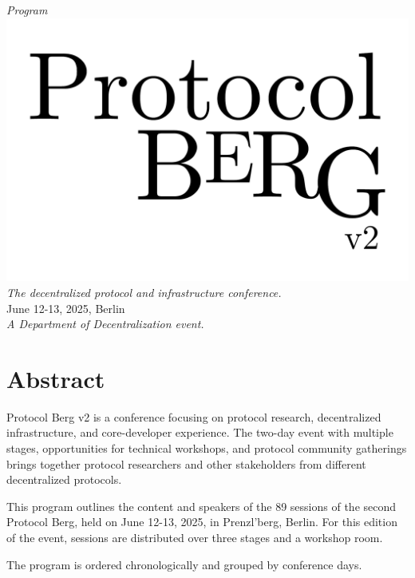 \begin{titlepage}
  \begin{center}
    \textit{\huge Program}\\[1em]
    \includegraphics[width=\textwidth]{protocol.pdf}\\[1em]
    \textit{The decentralized protocol and infrastructure conference.}\\
    {June 12-13, 2025, Berlin}\\[1em]
    \vspace{\fill}
    \textit{\small A Department of Decentralization event.}
  \end{center}
\end{titlepage}

\pagestyle{fancy}

\cleardoublepage

\section*{Abstract}
Protocol Berg v2 is a conference focusing on protocol research, decentralized
infrastructure, and core-developer experience. The two-day event with multiple
stages, opportunities for technical workshops, and protocol community gatherings
brings together protocol researchers and other stakeholders from different
decentralized protocols.

This program outlines the content and speakers of the 89 sessions of the second
Protocol Berg, held on June 12-13, 2025, in Prenzl'berg, Berlin. For this
edition of the event, sessions are distributed over three stages and a workshop
room.

The program is ordered chronologically and grouped by conference days.

\cleardoublepage

\tableofcontents

\cleardoublepage
